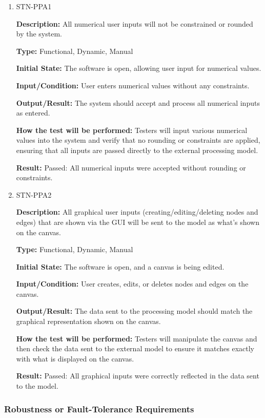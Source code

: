 \documentclass[12pt, titlepage]{article}
\begin{document}
\begin{enumerate}

\item{STN-PPA1\\}

\textbf{Description:} All numerical user inputs will not be constrained or rounded by the system.

\textbf{Type:} Functional, Dynamic, Manual

\textbf{Initial State:} The software is open, allowing user input for numerical values.

\textbf{Input/Condition:} User enters numerical values without any constraints.

\textbf{Output/Result:} The system should accept and process all numerical inputs as entered.

\textbf{How the test will be performed:} Testers will input various numerical values into the system and verify that no rounding or constraints are applied, ensuring that all inputs are passed directly to the external processing model.

\textbf{Result:} Passed: All numerical inputs were accepted without rounding or constraints.

\item{STN-PPA2\\}

\textbf{Description:} All graphical user inputs (creating/editing/deleting nodes and edges) that are shown via the GUI will be sent to the model as what’s shown on the canvas.

\textbf{Type:} Functional, Dynamic, Manual

\textbf{Initial State:} The software is open, and a canvas is being edited.

\textbf{Input/Condition:} User creates, edits, or deletes nodes and edges on the canvas.

\textbf{Output/Result:} The data sent to the processing model should match the graphical representation shown on the canvas.

\textbf{How the test will be performed:} Testers will manipulate the canvas and then check the data sent to the external model to ensure it matches exactly with what is displayed on the canvas.

\textbf{Result:} Passed: All graphical inputs were correctly reflected in the data sent to the model.

\end{enumerate}

\subsubsection{Robustness or Fault-Tolerance Requirements}
\end{document}
